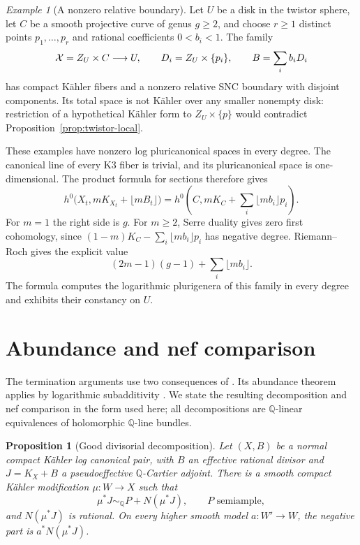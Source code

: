 \documentclass[11pt,a4paper]{article}
\numberwithin{equation}{section}
\newtheorem{proposition}[theorem]{Proposition}
\theoremstyle{definition}
\theoremstyle{remark}
\newtheorem{example}[theorem]{Example}
\newcommand{\Q}{\mathbb Q}\newcommand{\R}{\mathbb R}
\begin{document}
\begin{example}[A nonzero relative boundary]\label{ex:twistor-boundary}
Let $U$ be a disk in the twistor sphere, let $C$ be a smooth projective
curve of genus $g\ge2$, and choose $r\ge1$ distinct points $p_1,\ldots,p_r$
and rational coefficients $0<b_i<1$. The family
\[
 \mathcal X=Z_U\times C\longrightarrow U,
 \qquad D_i=Z_U\times\{p_i\},\qquad B=\sum_i b_iD_i
\]
has compact Kähler fibers and a nonzero relative SNC boundary with
disjoint components. Its total space is not Kähler over any smaller
nonempty disk: restriction of a hypothetical Kähler form to
$Z_U\times\{p\}$ would contradict Proposition~\ref{prop:twistor-local}.

These examples have nonzero log pluricanonical spaces in every degree.
The canonical line of every K3 fiber is trivial, and its pluricanonical
space is one-dimensional. The product formula for sections therefore
gives
\[
 h^0\bigl(X_t,mK_{X_t}+\lfloor mB_t\rfloor\bigr)
 =h^0\left(C,mK_C+\sum_i\lfloor mb_i\rfloor p_i\right).
\]
For $m=1$ the right side is $g$. For $m\ge2$, Serre duality gives
zero first cohomology, since
$(1-m)K_C-\sum_i\lfloor mb_i\rfloor p_i$ has negative degree.
Riemann--Roch gives the explicit value
\[
 (2m-1)(g-1)+\sum_i\lfloor mb_i\rfloor.
\]
The formula computes the logarithmic plurigenera of this family in
every degree and exhibits their constancy on $U$.
\end{example}

\appendix
\section{Abundance and nef comparison}\label{app:dependencies}
\label{app:canonical-dependencies}

The termination arguments use two consequences of
\cite{OAI034}. Its abundance theorem
\cite[Theorem~2.13]{OAI034} applies by logarithmic subadditivity
\cite[Corollary~6.2]{OAI033}. We state the resulting decomposition
and nef comparison in the form used here; all decompositions are
$\Q$-linear equivalences of holomorphic $\Q$-line bundles.

\begin{proposition}[Good divisorial decomposition]
\label{prop:decomposition-input}\label{in:good}
Let $(X,B)$ be a normal compact Kähler log canonical pair, with
$B$ an effective rational divisor and $J=K_X+B$ a pseudoeffective
$\mathbb Q$-Cartier adjoint. There is a smooth compact Kähler
modification $\mu:W\to X$ such that
\[
 \mu^*J\sim_{\mathbb Q}P+N(\mu^*J),
 \qquad P\text{ semiample},
\]
and $N(\mu^*J)$ is rational. On every higher smooth model
$a:W'\to W$, the negative part is $a^*N(\mu^*J)$.
\end{proposition}
\end{document}
